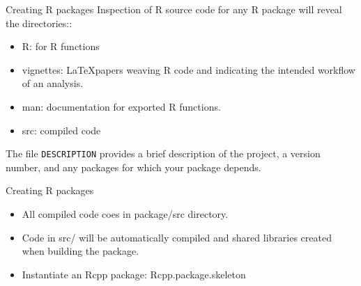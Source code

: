 \documentclass{beamer}\usepackage[]{graphicx}\usepackage[]{color}
\begin{document}
\begin{frame}[fragile]{Creating R packages}
    \vspace{0.5em}
    Inspection of R source code for any R package will reveal the directories::
    \begin{itemize}\itemsep1em
        \item R: for R functions
        \item vignettes: \LaTeX papers weaving R code and indicating the
            intended workflow of an analysis.
        \item man: documentation for exported R functions.
        \item src: compiled code
    \end{itemize}
The file \verb|DESCRIPTION| provides a brief description of the project, a version
number, and any packages for which your package depends.
\end{frame}
\begin{frame}[fragile]{Creating R packages}
    \vspace{0.5em}
    \begin{itemize}\itemsep1em
        \item All compiled code coes in package/src directory.
        \item Code in src/ will be automatically compiled and shared libraries
            created when building the package.
        \item Instantiate an Rcpp package: Rcpp.package.skeleton

    \end{itemize}
\end{frame}
\end{document}
